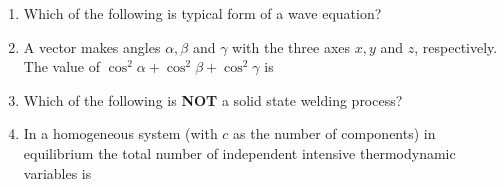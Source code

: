 \documentclass[journal,12pt,onecolumn]{IEEEtran}
\theoremstyle{remark}
\begin{document}
\begin{enumerate}
    \item Which of the following is typical form of a wave equation? 
    \hfill{}
    \begin{enumerate}[label=(\Alph*)]
    \end{enumerate}

    \item A vector makes angles $\alpha, \beta$ and $\gamma$ with the three axes $x, y$ and $z$, respectively.  
    The value of $\cos^2 \alpha + \cos^2 \beta + \cos^2 \gamma$ is  
    \hfill{}
    \begin{enumerate}[label=(\Alph*)]
    \end{enumerate}

    \item Which of the following is \textbf{NOT} a solid state welding process?  
    \hfill{}
    \begin{enumerate}[label=(\Alph*)]
    \end{enumerate}

    \item In a homogeneous system (with $c$ as the number of components) in equilibrium the total number of independent intensive thermodynamic variables is  
    \hfill{}
    \begin{enumerate}[label=(\Alph*)]
    \end{enumerate}


\end{enumerate}
\end{document}
